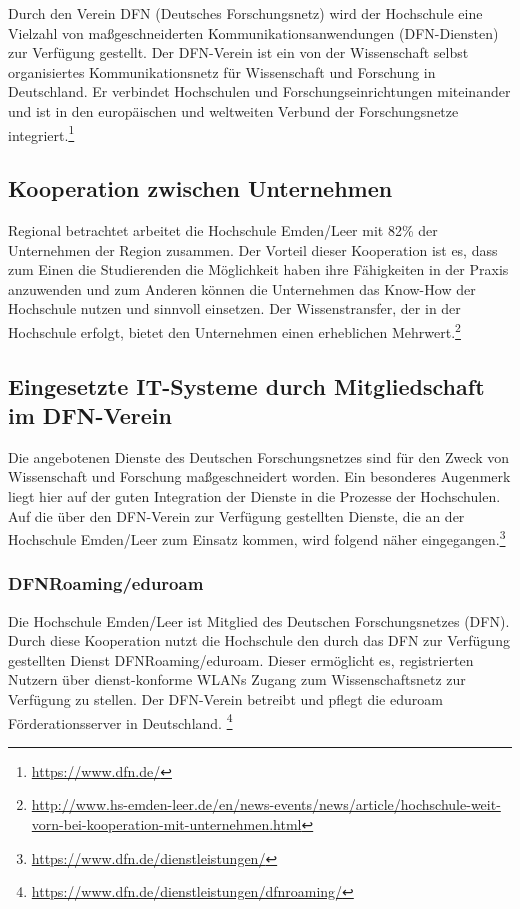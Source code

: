 Durch den Verein DFN (Deutsches Forschungsnetz) wird der Hochschule eine Vielzahl von maßgeschneiderten Kommunikationsanwendungen (DFN-Diensten) zur Verfügung gestellt. Der DFN-Verein ist ein von der Wissenschaft selbst organisiertes Kommunikationsnetz für Wissenschaft und Forschung in Deutschland. Er verbindet Hochschulen und Forschungseinrichtungen miteinander und ist in den europäischen und weltweiten  Verbund der Forschungsnetze integriert.\footnote{\url{https://www.dfn.de/}}

\subsection{Kooperation zwischen Unternehmen}
Regional betrachtet arbeitet die Hochschule Emden/Leer mit 82\% der Unternehmen der Region zusammen. 
Der Vorteil dieser Kooperation ist es, dass zum Einen die Studierenden die Möglichkeit haben ihre Fähigkeiten 
in der Praxis anzuwenden und zum Anderen können die Unternehmen das Know-How  der Hochschule nutzen 
und sinnvoll einsetzen. Der Wissenstransfer, der in der Hochschule erfolgt, bietet den Unternehmen einen erheblichen Mehrwert.\footnote{\url{http://www.hs-emden-leer.de/en/news-events/news/article/hochschule-weit-vorn-bei-kooperation-mit-unternehmen.html}}

\subsection{Eingesetzte IT-Systeme durch Mitgliedschaft im DFN-Verein}
Die angebotenen Dienste des Deutschen Forschungsnetzes sind für den Zweck von Wissenschaft und Forschung maßgeschneidert worden. Ein besonderes Augenmerk liegt hier auf der guten Integration der Dienste in die Prozesse der Hochschulen.  Auf die über den DFN-Verein zur Verfügung gestellten Dienste, die an der Hochschule Emden/Leer zum Einsatz kommen, wird folgend näher eingegangen.\footnote{\url{https://www.dfn.de/dienstleistungen/}}

\subsubsection{DFNRoaming/eduroam}
Die Hochschule Emden/Leer ist Mitglied des Deutschen Forschungsnetzes (DFN). Durch diese Kooperation nutzt die Hochschule den durch das DFN zur Verfügung gestellten Dienst DFNRoaming/eduroam. Dieser ermöglicht es, registrierten Nutzern über dienst-konforme WLANs Zugang zum Wissenschaftsnetz zur Verfügung zu stellen. Der DFN-Verein betreibt und pflegt die eduroam Förderationsserver in Deutschland. \footnote{\url{https://www.dfn.de/dienstleistungen/dfnroaming/}} 

